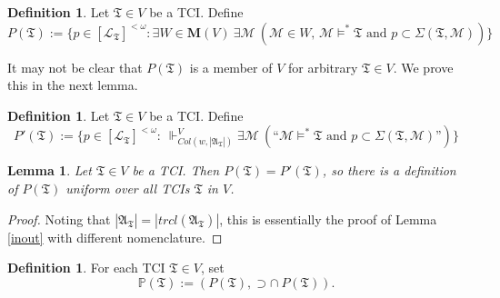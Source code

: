 \documentclass[12pt, twoside]{memoir}
\numberwithin{equation}{section}
\newtheorem{lem}[thm]{Lemma}
\theoremstyle{definition}
\newtheorem{defi}[thm]{Definition}
\theoremstyle{remark}
\theoremstyle{definition}
\theoremstyle{definition}
\theoremstyle{definition}
\theoremstyle{remark}
\begin{document}
\begin{defi}
Let $\mathfrak{T} \in V$ be a TCI. Define 
\begin{equation*}
    P(\mathfrak{T}) := \{p \in [\mathcal{L}_{\mathfrak{T}}]^{< \omega} : \exists W \! \in \! \mathbf{M}(V) \ \exists \mathcal{M} \ (\mathcal{M} \in W \text{, } \mathcal{M} \models^* \mathfrak{T} \text{ and } p \subset \Sigma(\mathfrak{T}, \mathcal{M}))\}
\end{equation*}
\end{defi}

It may not be clear that $P(\mathfrak{T})$ is a member of $V$ for arbitrary $\mathfrak{T} \in V$. We prove this in the next lemma.

\begin{defi}
Let $\mathfrak{T} \in V$ be a TCI. Define 
\begin{equation*}
    P'(\mathfrak{T}) := \{p \in [\mathcal{L}_{\mathfrak{T}}]^{< \omega} : \ \Vdash^V_{Col(w, |\mathfrak{A}_{\mathfrak{T}}|)} \exists \mathcal{M} \ (\text{``} \mathcal{M} \models^* \mathfrak{T} \text{ and } p \subset \Sigma(\mathfrak{T}, \mathcal{M}) \text{''})\}
\end{equation*}
\end{defi}

\begin{lem}
Let $\mathfrak{T} \in V$ be a TCI. Then $P(\mathfrak{T}) = P'(\mathfrak{T})$, so there is a definition of $P(\mathfrak{T})$ uniform over all TCIs $\mathfrak{T}$ in $V$.
\end{lem}

\begin{proof}
Noting that $|\mathfrak{A}_{\mathfrak{T}}| = |trcl(\mathfrak{A}_{\mathfrak{T}})|$, this is essentially the proof of Lemma \ref{inout} with different nomenclature.
\end{proof}

\begin{defi}
For each TCI $\mathfrak{T} \in V$, set 
\begin{equation*}
    \mathbb{P}(\mathfrak{T}) := (P(\mathfrak{T}), \supset \cap \ P(\mathfrak{T})) \text{.}
\end{equation*}
\end{defi}
\end{document}
